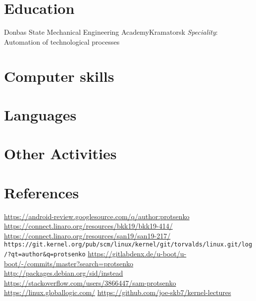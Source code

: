 \documentclass[11pt,a4paper]{moderncv}
\begin{document}
\section{Education}
  {Donbas State Mechanical Engineering Academy}{Kramatorsk}{}
  {\textit{Speciality}: Automation of technological processes}

\section{Computer skills}

\section{Languages}

\pagebreak

\section{Other Activities}


\section{References}

\begin{thebibliography}{9}
 \color{web} \url{https://android-review.googlesource.com/q/author:protsenko}
 \color{web} \url{https://connect.linaro.org/resources/bkk19/bkk19-414/}
 \color{web} \url{https://connect.linaro.org/resources/san19/san19-217/}
 \color{web} \nolinkurl{https://git.kernel.org/pub/scm/linux/kernel/git/torvalds/linux.git/log/?qt=author&q=protsenko}
 \color{web} \url{https://gitlabdenx.de/u-boot/u-boot/-/commits/master?search=protsenko}
 \color{web} \url{http://packages.debian.org/sid/instead}
 \color{web} \url{https://stackoverflow.com/users/3866447/sam-protsenko}
 \color{web} \url{https://linux.globallogic.com/}
 \color{web} \url{https://github.com/joe-skb7/kernel-lectures}
\end{thebibliography}
\end{document}
